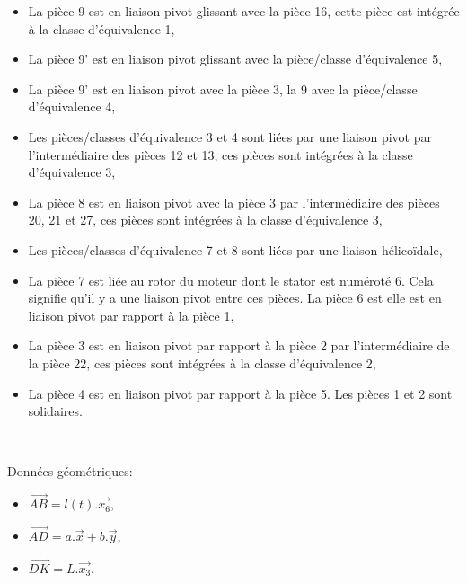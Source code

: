 \begin{itemize}
 \item La pièce 9 est en liaison pivot glissant avec la pièce 16, cette pièce est intégrée à la classe d'équivalence 1,
 \item La pièce 9' est en liaison pivot glissant avec la pièce/classe d'équivalence 5,
 \item La pièce 9' est en liaison pivot avec la pièce 3, la 9 avec la pièce/classe d'équivalence 4,
 \item Les pièces/classes d'équivalence 3 et 4 sont liées par une liaison pivot par l'intermédiaire des pièces 12 et 13, ces pièces sont intégrées à la classe d'équivalence 3,
 \item La pièce 8 est en liaison pivot avec la pièce 3 par l'intermédiaire des pièces 20, 21 et 27, ces pièces sont intégrées à la classe d'équivalence 3,
 \item Les pièces/classes d'équivalence 7 et 8 sont liées par une liaison hélicoïdale,
 \item La pièce 7 est liée au rotor du moteur dont le stator est numéroté 6. Cela signifie qu'il y a une liaison pivot entre ces pièces. La pièce 6 est elle est en liaison pivot par rapport à la pièce 1,
 \item La pièce 3 est en liaison pivot par rapport à la pièce 2 par l'intermédiaire de la pièce 22, ces pièces sont intégrées à la classe d'équivalence 2,
 \item La pièce 4 est en liaison pivot par rapport à la pièce 5. Les pièces 1 et 2 sont solidaires.
\end{itemize}

~\

Données géométriques:
\begin{itemize}
 \item $\overrightarrow{AB}=l(t).\overrightarrow{x_6}$,
 \item $\overrightarrow{AD}=a.\overrightarrow{x}+b.\overrightarrow{y}$,
 \item $\overrightarrow{DK}=L.\overrightarrow{x_3}$.
\end{itemize}




